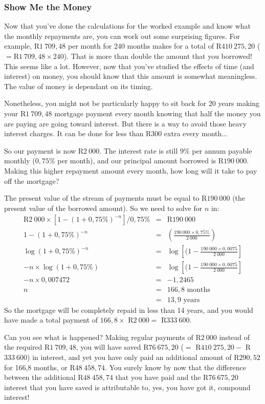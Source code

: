 \subsubsection{Show Me the Money}
Now that you've done the calculations for the worked example and know what the monthly repayments are, you can work out some surprising figures. For example, R$1~709,48$ per month for 240 months makes for a total of R$410~275,20$ ($=$R$1~709,48 \times 240$). That is more than double the amount that you borrowed! This seems like a lot. However, now that you've studied the effects of time (and interest) on money, you should know that this amount is somewhat meaningless. The value of money is dependant on its timing.

Nonetheless, you might not be particularly happy to sit back for 20 years making your R$1~709,48$ mortgage payment every month knowing that half the money you are paying are going toward interest. But there is a way to avoid those heavy interest charges. It can be done for less than R$300$ extra every month...

So our payment is now R$2~000$. The interest rate is still $9\%$ per annum payable monthly ($0,75\%$ per month), and our principal amount borrowed is R$190~000$. Making this higher repayment amount every month, how long will it take to pay off the mortgage?

The present value of the stream of payments must be equal to R$190~000$ (the present value of the borrowed amount). So we need to solve for $n$ in:
\begin{eqnarray*}
\mbox{R}2~000 \times [1 - (1 + 0,75\%)^{-n}]/0,75\% &=& \mbox{R}190~000\\
1 - (1 + 0,75\%)^{-n} &=& (\frac{190~000\times 0,75\%}{2~000})\\
\log(1+0,75\%)^{-n} &=& \log[(1 - \frac{190~000\times 0,0075}{2~000}]\\
-n\times \log(1+0,75\%) &=& \log[(1 - \frac{190~000\times 0,0075}{2~000}]\\
-n \times 0,007472 &=& -1,2465\\
n &=& 166,8 \mbox{ months}\\
& =& 13,9 \mbox{ years}
\end{eqnarray*}
So the mortgage will be completely repaid in less than 14 years, and you would have made a total payment of $166,8\times$ R$2~000 =$ R$333~600$.

Can you see what is happened? Making regular payments of R$2~000$ instead of the required R$1~709,48$, you will have saved R$76~675,20$ ($=$ R$410~275,20 -$ R$333~600$) in interest, and yet you have only paid an additional amount of R$290,52$ for 166,8 months, or R$48~458,74$. You surely know by now that the difference between the additional R$48~458,74$ that you have paid and the R$76~675,20$ interest that you have saved is attributable to, yes, you have got it, compound interest!

